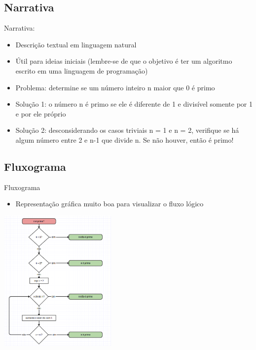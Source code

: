 \documentclass[portuguese,10pt,xcolor=table]{bredelebeamer}
\begin{document}
\subsection{Narrativa}
\begin{frame}
	Narrativa:
\begin{itemize}
	\item Descrição textual em linguagem natural
	\item Útil para ideias iniciais (lembre-se de que o objetivo é ter um algoritmo escrito em uma linguagem de programação)
	\item Problema: determine se um número inteiro n maior que 0 é primo
		\item Solução 1: o número n é primo se ele é diferente de 1 e divisível somente por 1 e por ele próprio
		\item Solução 2: desconsiderando os casos triviais n = 1 e n = 2, verifique se há algum número entre 2 e n-1 que divide n. Se não houver, então é primo!
\end{itemize}
\end{frame}


\subsection{Fluxograma}
\begin{frame}
	Fluxograma
	\begin{itemize}
		\item Representação gráfica muito boa para visualizar o fluxo lógico
	\end{itemize}
	\includegraphics[height=7cm]{fluxograma.png}
\end{frame}
\end{document}
